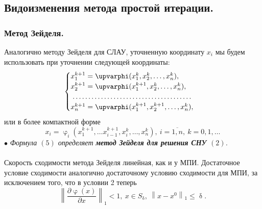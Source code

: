 \documentclass[a4paper, 12pt]{report}
\numberwithin{equation}{section}
\renewcommand{\leq}{\leqslant}
\renewcommand{\delta}{\updelta}
\renewcommand{\varphi}{\upvarphi}
\newcommand\Norm[1]{\left\| #1 \right\|}
\begin{document}
\subsection{Видоизменения метода простой итерации.}
\subsubsection{Метод Зейделя.}
Аналогично методу Зейделя для СЛАУ, уточненную координату $x_i$ мы будем использовать при уточнении следующей координаты:
\begin{equation}
	\begin{cases}
	x_1^{k+1} = \varphi(x_1^k, x_2^k,\ldots, x_n^k),\\
	x_2^{k+1} = \varphi(x_1^{k+1}, x_2^k,\ldots, x_n^k),\\
	\dotfill\\
	x_n^{k+1} = \varphi(x_1^{k+1}, x_2^{k+1},\ldots, x_n^k),
\end{cases}
\end{equation} 
или в более компактной форме 
\begin{equation}
	x_i = \varphi_i(x_1^{k+1},\ldots x_{i-1}^{k+1}, x_i^k,\ldots, x_n^k),\ i=\overline{1,n},\ k=0,1,\ldots\tag{5}
\end{equation}
$\bullet$ \textit{Формула $(5)$ определяет \textbf{метод Зейделя для решения СНУ $(2)$}.}
\\\\
Скорость сходимости метода Зейделя линейная, как и у МПИ. Достаточное условие сходимости аналогично достаточному условию сходимости для МПИ, за исключением того, что в условии 2 теперь 
\begin{equation}
	\Norm{\dfrac{\partial \varphi(x)}{\partial x}}_1 < 1,\ x \in S_\delta,\ \Norm{x-x^0}_1\leq \delta.
\end{equation}
\end{document}
